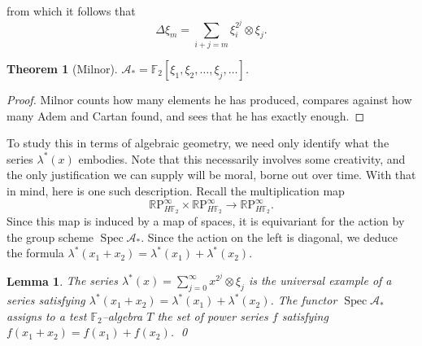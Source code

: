 \documentclass{article}
\newcommand{\F}{\mathbb F}
\newcommand{\R}{\mathbb R}
\newcommand{\RP}{\R\mathrm P}
\newcommand{\<}{\langle}
\renewcommand{\>}{\rangle}
\DeclareMathOperator{\Spec}{Spec}
\numberwithin{equation}{section}
\theoremstyle{plain}
\newtheorem{theorem}[equation]{Theorem}
\newtheorem{lemma}[equation]{Lemma}
\theoremstyle{definition}
\theoremstyle{remark}
\begin{document}
from which it follows that \[\Delta \xi_m = \sum_{i+j=m} \xi_i^{2^j} \otimes \xi_j.\]
\begin{theorem}[Milnor]
$\mathcal A_* = \F_2[\xi_1, \xi_2, \ldots, \xi_j, \ldots]$.
\end{theorem}
\begin{proof}
Milnor counts how many elements he has produced, compares against how many Adem and Cartan found, and sees that he has exactly enough.
\end{proof}

To study this in terms of algebraic geometry, we need only identify what the series $\lambda^*(x)$ embodies.  Note that this necessarily involves some creativity, and the only justification we can supply will be moral, borne out over time.  With that in mind, here is one such description.  Recall the multiplication map \[\RP^\infty_{H\F_2} \times \RP^\infty_{H\F_2} \to \RP^\infty_{H\F_2}.\]  Since this map is induced by a map of spaces, it is equivariant for the action by the group scheme $\Spec \mathcal A_*$.  Since the action on the left is diagonal, we deduce the formula $\lambda^*(x_1 + x_2) = \lambda^*(x_1) + \lambda^*(x_2)$.

\begin{lemma}
The series $\lambda^*(x) = \sum_{j=0}^\infty x^{2^j} \otimes \xi_j$ is the universal example of a series satisfying $\lambda^*(x_1 + x_2) = \lambda^*(x_1) + \lambda^*(x_2)$.  The functor $\Spec \mathcal A_*$ assigns to a test $\F_2$--algebra $T$ the set of power series $f$ satisfying $f(x_1 + x_2) = f(x_1) + f(x_2)$. \qed
\end{lemma}
\end{document}
